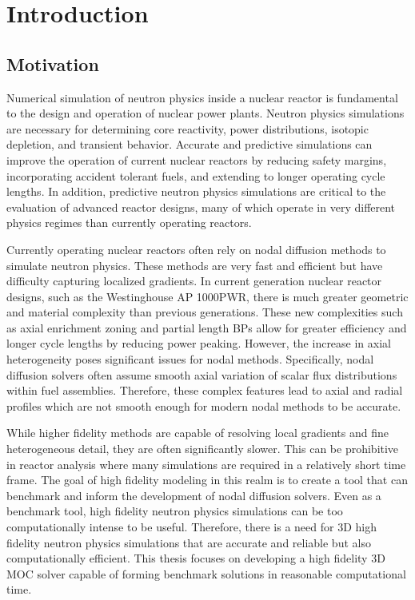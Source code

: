 \chapter{Introduction}
\label{chap:intro}

\section{Motivation}
\label{sec:chap1-motivation}


Numerical simulation of neutron physics inside a nuclear reactor is fundamental to the design and operation of nuclear power plants. Neutron physics simulations are necessary for determining core reactivity, power distributions, isotopic depletion, and transient behavior. Accurate and predictive simulations can improve the operation of current nuclear reactors by reducing safety margins, incorporating accident tolerant fuels, and extending to longer operating cycle lengths. In addition, predictive neutron physics simulations are critical to the evaluation of advanced reactor designs, many of which operate in very different physics regimes than currently operating reactors. 

Currently operating nuclear reactors often rely on nodal diffusion methods to simulate neutron physics. These methods are very fast and efficient but have difficulty capturing localized gradients. In current generation nuclear reactor designs, such as the Westinghouse AP 1000\texttrademark \ac{PWR}, there is much greater geometric and material complexity than previous generations. These new complexities such as axial enrichment zoning and partial length \ac{BP}s allow for greater efficiency and longer cycle lengths by reducing power peaking. However, the increase in axial heterogeneity poses significant issues for nodal methods. Specifically, nodal diffusion solvers often assume smooth axial variation of scalar flux distributions within fuel assemblies. Therefore, these complex features  lead to axial and radial profiles which are not smooth enough for modern nodal methods to be accurate.

While higher fidelity methods are capable of resolving local gradients and fine heterogeneous detail, they are often significantly slower. This can be prohibitive in reactor analysis where many simulations are required in a relatively short time frame. The goal of high fidelity modeling in this realm is to create a tool that can benchmark and inform the development of nodal diffusion solvers. Even as a benchmark tool, high fidelity neutron physics simulations can be too computationally intense to be useful. Therefore, there is a need for 3D high fidelity neutron physics simulations that are accurate and reliable but also computationally efficient. This thesis focuses on developing a high fidelity 3D \ac{MOC} solver capable of forming benchmark solutions in reasonable computational time.

